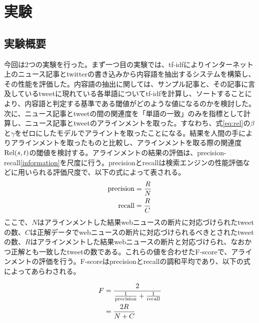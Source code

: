 \documentclass[12pt]{jarticle}
\begin{document}

\section{実験}
\subsection{実験概要}
今回は2つの実験を行った。まず一つ目の実験では、tf-idfによりインターネット上のニュース記事とtwitterの書き込みから内容語を抽出するシステムを構築し、その性能を評価した。内容語の抽出に関しては、サンプル記事と、その記事に言及しているtweetに現れている各単語についてtf-idfを計算し、ソートすることにより、内容語と判定する基準である閾値がどのような値になるのかを検討した。次に、ニュース記事とtweetの間の関連度を「単語の一致」のみを指標として計算し、ニュース記事とtweetのアラインメントを取った。すなわち、式\ref{eq:rel}の$\beta$と$\gamma$をゼロにしたモデルでアライントを取ったことになる。結果を人間の手によりアラインメントを取ったものと比較し、アラインメントを取る際の関連度${\rm Rel}(s, t)$の閾値を検討する。アラインメントの結果の評価は、precision-recall\ref{information}を尺度に行う。precisionとrecallは検索エンジンの性能評価などに用いられる評価尺度で、以下の式によって表される。
\begin{align}
  {\rm precision} &= \frac{R}{N}\\
  {\rm recall} &= \frac{R}{C}
\end{align}
  ここで、$N$はアラインメントした結果webニュースの断片に対応づけられたtweetの数、$C$は正解データでwebニュースの断片に対応づけられるべきとされたtweetの数、$R$はアラインメントした結果webニュースの断片と対応づけられ、なおかつ正解とも一致したtweetの数である。これらの値を合わせたF-scoreで、アラインメントの評価を行う。F-scoreはprecisionとrecallの調和平均であり、以下の式によってあらわされる。

\begin{align}
  F &= \frac{2}{\frac{1}{\rm precision} + \frac{1}{\rm recall}} \\
    &= \frac{2R}{N+C}
\end{align}
\end{document}
